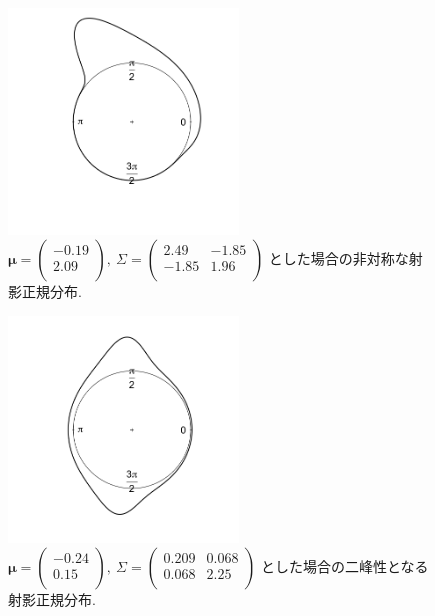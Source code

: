 \documentclass[a4paper,11pt]{jarticle}
\begin{document}
\begin{figure}[H]  
\begin{center}
\includegraphics[clip,height= 60mm]{data/sample_asymmetry.png}
\caption[Text excluding the matrix]{
$\bm \mu = \begin{pmatrix} -0.19 \\ 2.09 \\ \end{pmatrix}, \ \Sigma = \begin{pmatrix} 2.49 & -1.85 \\ -1.85 & 1.96 \\ \end{pmatrix}$ とした場合の非対称な射影正規分布.}
\label{sample_pnc2}
\end{center}
\end{figure}

\begin{figure}[H]  
\begin{center}
\includegraphics[clip,height= 60mm]{data/sample_bimodal.png}
\caption[Text excluding the matrix]{
$\bm \mu = \begin{pmatrix} -0.24 \\ 0.15 \\ \end{pmatrix}, \ \Sigma = \begin{pmatrix} 0.209 & 0.068\\ 0.068 & 2.25 \\ \end{pmatrix}$ とした場合の二峰性となる射影正規分布.}
\label{sample_pnc3}
\end{center}
\end{figure}
\end{document}
